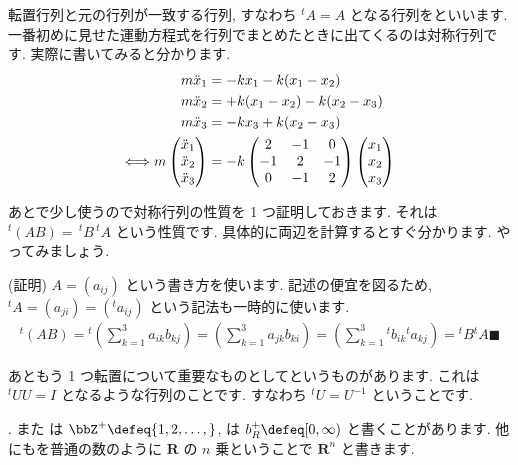 \documentclass[openany, a4paper, oneside]{jsbook}
\begin{document}
{転置行列と元の行列が一致する行列, すなわち $^{t} A = A$ となる行列をといいます.
一番初めに見せた運動方程式を行列でまとめたときに出てくるのは対称行列です. 実際に書いてみると分かります.
\begin{align}
    m\ddot{x}_{1} &= -kx_1 - k (x_1 - x_2 ) \notag \\
    m\ddot{x}_{2} &= + k (x_1 - x_2 ) - k (x_2 - x_3) \notag \\
    m\ddot{x}_{3} &= -kx_3 +k (x_2 - x_3 )  \notag \\
    \Longleftrightarrow
    m \begin{pmatrix} \ddot{x}_{1} \\ \ddot{x}_{2} \\ \ddot{x}_{3} \end{pmatrix}
    &= -k \begin{pmatrix} 2 & -1 & 0 \\ -1 & 2 & -1 \\ 0 & -1 & 2 \end{pmatrix}
    \begin{pmatrix} x_{1} \\ x_{2} \\ x_{3} \end{pmatrix} \notag
\end{align}

あとで少し使うので対称行列の性質を 1 つ証明しておきます. それは $^{t}(AB) =\, ^{t}B \, ^{t}A$ という性質です.
具体的に両辺を計算するとすぐ分かります. やってみましょう.

(証明) $A=(a_{ij})$ という書き方を使います.
記述の便宜を図るため,  $^{t}A = (a_{j i}) = (^{t}a_{ij})$ という記法も一時的に使います.
\begin{align}
    {^t}(AB)
    = {^t} \left ( \sum_{k=1}^3 a_{i k}b_{k j} \right)
    = \left ( \sum_{k=1}^3 a_{j k}b_{k i} \right)
    = \left ( \sum_{k=1}^3 {^t}b_{i k} {^t}a_{k j} \right)
    = {^t}B {^t}A \blacksquare
\end{align}

あともう 1 つ転置について重要なものとしてというものがあります.
これは $^{t}U U=I$ となるような行列のことです.
すなわち $^{t}U = U^{-1}$ ということです.}.
また
は
$\bbZ^+ \defeq \{ 1, 2 , \dots , \}$,
は
 $b_R^+ \defeq [ 0 , \infty )$
と書くことがあります.
他にもを普通の数のように $\bm{R}$ の $n$ 乗ということで $\bm{R}^{n}$ と書きます.
\end{document}
